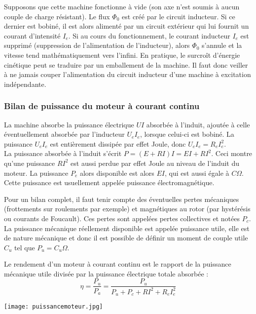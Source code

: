 \documentclass[12pt,prb,aps,epsf]{article}
\begin{document}
Supposons que cette machine fonctionne à vide (son axe n'est soumis à aucun couple de charge résistant). Le flux $\Phi_0$ est créé par le circuit inducteur. Si ce dernier est bobiné, il est alors alimenté par un circuit extérieur qui lui fournit un courant d'intensité $I_e$. Si au cours du fonctionnement, le courant inducteur $I_e$ est supprimé (suppression de l'alimentation de l'inducteur), alors $\Phi_0$ s'annule et la vitesse tend mathématiquement vers l'infini. En pratique, le surcroît d'énergie cinétique peut se traduire par un emballement de la machine. Il faut donc veiller à ne jamais couper l'alimentation du circuit inducteur d'une machine à excitation indépendante. 

\subsubsection{Bilan de puissance du moteur à courant continu}

La machine absorbe la puissance électrique $UI$ absorbée à l'induit, ajoutée à celle éventuellement absorbée par l'inducteur $U_e I_e$, lorsque celui-ci est bobiné. La puissance $U_e I_e$ est entièrement dissipée par effet Joule, donc $U_e I_e = R_e I_e^2$.\\
La puissance absorbée à l'induit s'écrit $P = (E + RI)I = EI + RI^2$. Ceci montre qu'une puissance $RI^2$ est aussi perdue par effet Joule au niveau de l'induit du moteur. La puissance $P_e$ alors disponible est alors $EI$, qui est aussi égale à $C\Omega$. Cette puissance est usuellement appelée puissance électromagnétique.\medskip

Pour un bilan complet, il faut tenir compte des éventuelles pertes mécaniques (frottements sur roulements par exemple) et magnétiques au rotor (par hystérésis ou courants de Foucault). Ces pertes sont appelées pertes collectives et notées $P_c$. La puissance mécanique réellement disponible est appelée puissance utile, elle est de nature mécanique et donc il est possible de définir un moment de couple utile $C_u$ tel que $P_u = C_u \Omega$.\medskip

Le rendement d'un moteur à courant continu est le rapport de la puissance mécanique utile divisée par la puissance électrique totale absorbée : 
\begin{equation}
    \eta = \frac{P_u}{P_a} = \frac{P_u}{P_u + P_c + RI^2 + R_e I_e^2}
\end{equation}

\medskip

\begin{center}
    \texttt{[image: puissancemoteur.jpg]}
\end{center}
\end{document}
